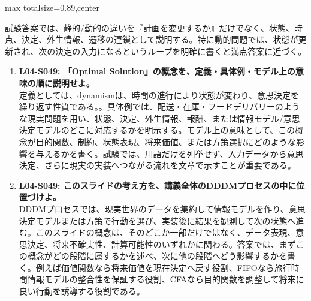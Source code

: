 \begin{minipage}[t]{0.58\textwidth}
\begin{adjustbox}{max totalsize={\textwidth}{0.89\textheight},center}
\begin{minipage}{\textwidth}
試験答案では、静的/動的の違いを『計画を変更するか』だけでなく、状態、時点、決定、外生情報、遷移の連鎖として説明する。特に動的問題では、状態が更新され、次の決定の入力になるというループを明確に書くと満点答案に近づく。\par{}\begin{enumerate}\item \textbf{L04-S049: 「Optimal Solution」の概念を、定義・具体例・モデル上の意味の順に説明せよ。}\\定義としては、dynamismは、時間の進行により状態が変わり、意思決定を繰り返す性質である。。具体例では、配送・在庫・フードデリバリーのような現実問題を用い、状態、決定、外生情報、報酬、または情報モデル/意思決定モデルのどこに対応するかを明示する。モデル上の意味として、この概念が目的関数、制約、状態表現、将来価値、または方策選択にどのような影響を与えるかを書く。試験では、用語だけを列挙せず、入力データから意思決定、さらに現実の実装へつながる流れを文章で示すことが重要である。\item \textbf{L04-S049: このスライドの考え方を、講義全体のDDDMプロセスの中に位置づけよ。}\\DDDMプロセスでは、現実世界のデータを集約して情報モデルを作り、意思決定モデルまたは方策で行動を選び、実装後に結果を観測して次の状態へ進む。このスライドの概念は、そのどこか一部だけではなく、データ表現、意思決定、将来不確実性、計算可能性のいずれかに関わる。答案では、まずこの概念がどの段階に属するかを述べ、次に他の段階へどう影響するかを書く。例えば価値関数なら将来価値を現在決定へ戻す役割、FIFOなら旅行時間情報モデルの整合性を保証する役割、CFAなら目的関数を調整して将来に良い行動を誘導する役割である。\end{enumerate}
\end{minipage}
\end{adjustbox}
\end{minipage}


